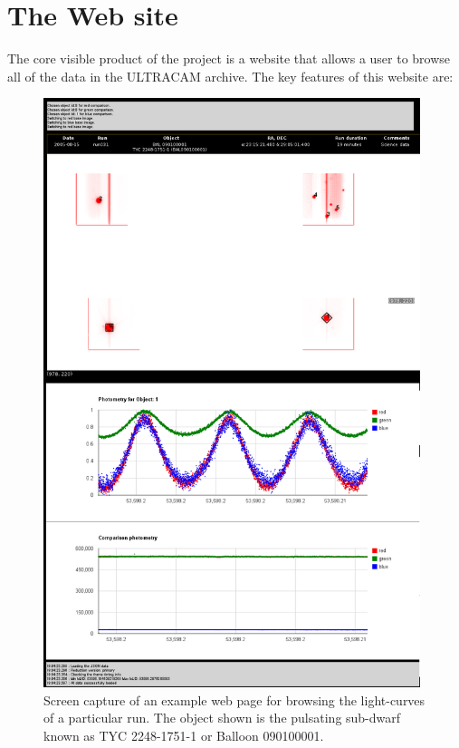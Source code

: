 \section{The Web site}
The core visible product of the project is a website that allows a user to browse all of the data in the ULTRACAM archive. The key features of this website are:
\begin{figure}[!h]
	\centering
	\includegraphics[width=110mm]{images/run031_on_the_night_of_2005-08-15.png}
	\caption{Screen capture of an example web page for browsing the light-curves of a particular run. The object shown is the pulsating sub-dwarf known as TYC 2248-1751-1 or Balloon 090100001.}
	\label{browser}
\end{figure}

